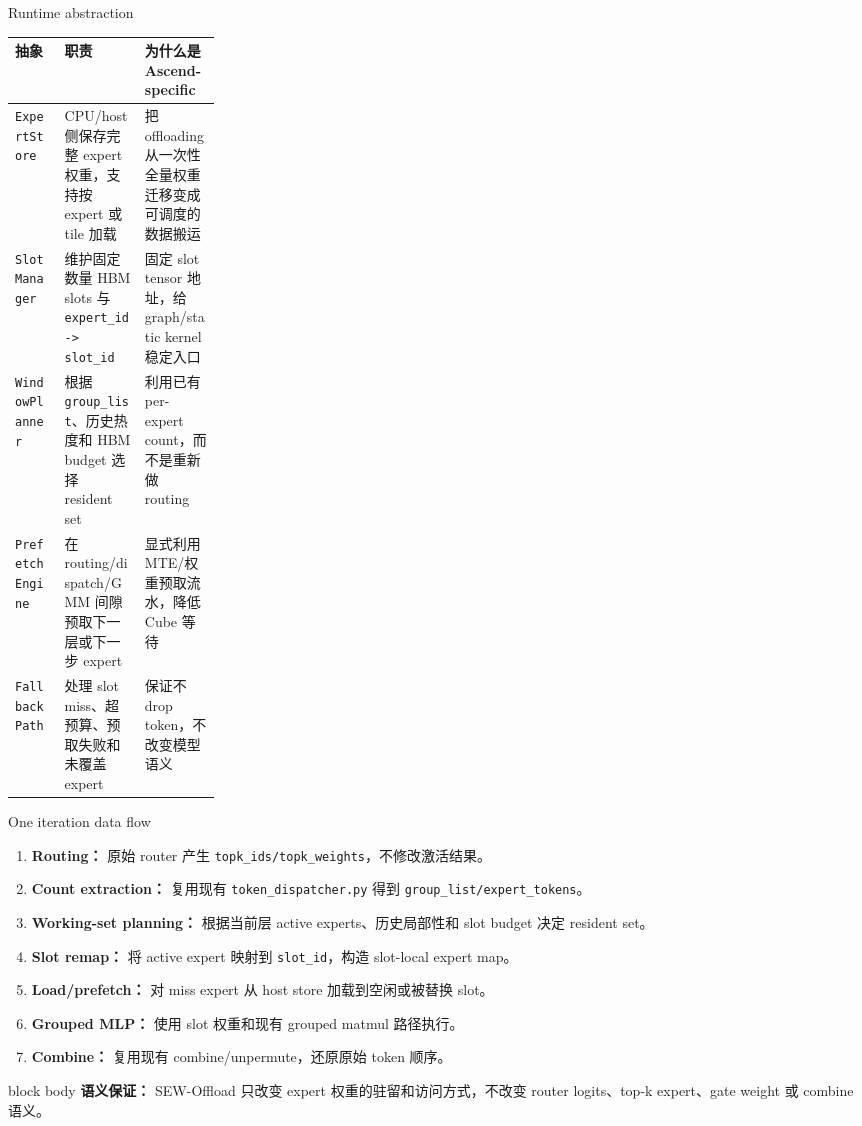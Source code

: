\documentclass[aspectratio=169,10pt]{beamer}
\begin{document}
\begin{frame}[t]{Runtime abstraction}
\small
\vspace{-0.4em}

\begin{tabularx}{\linewidth}{p{0.24\linewidth}X X}
\toprule
\textbf{抽象} & \textbf{职责} & \textbf{为什么是 Ascend-specific} \\
\midrule
\texttt{ExpertStore} &
CPU/host 侧保存完整 expert 权重，支持按 expert 或 tile 加载 &
把 offloading 从一次性全量权重迁移变成可调度的数据搬运 \\
\texttt{SlotManager} &
维护固定数量 HBM slots 与 \texttt{expert\_id -> slot\_id} &
固定 slot tensor 地址，给 graph/static kernel 稳定入口 \\
\texttt{WindowPlanner} &
根据 \texttt{group\_list}、历史热度和 HBM budget 选择 resident set &
利用已有 per-expert count，而不是重新做 routing \\
\texttt{PrefetchEngine} &
在 routing/dispatch/GMM 间隙预取下一层或下一步 expert &
显式利用 MTE/权重预取流水，降低 Cube 等待 \\
\texttt{FallbackPath} &
处理 slot miss、超预算、预取失败和未覆盖 expert &
保证不 drop token，不改变模型语义 \\
\bottomrule
\end{tabularx}
\end{frame}

\begin{frame}[t]{One iteration data flow}
\small
\vspace{-0.35em}

\begin{enumerate}
  \setlength\itemsep{0.65em}
  \item \textbf{Routing：} 原始 router 产生 \texttt{topk\_ids/topk\_weights}，不修改激活结果。
  \item \textbf{Count extraction：} 复用现有 \texttt{token\_dispatcher.py} 得到 \texttt{group\_list/expert\_tokens}。
  \item \textbf{Working-set planning：} 根据当前层 active experts、历史局部性和 slot budget 决定 resident set。
  \item \textbf{Slot remap：} 将 active expert 映射到 \texttt{slot\_id}，构造 slot-local expert map。
  \item \textbf{Load/prefetch：} 对 miss expert 从 host store 加载到空闲或被替换 slot。
  \item \textbf{Grouped MLP：} 使用 slot 权重和现有 grouped matmul 路径执行。
  \item \textbf{Combine：} 复用现有 combine/unpermute，还原原始 token 顺序。
\end{enumerate}

\vspace{0.55em}
\begin{beamercolorbox}[wd=\linewidth,sep=0.7em,rounded=true]{block body}
\textbf{\textcolor{AccentRed}{语义保证：}}
SEW-Offload 只改变 expert 权重的驻留和访问方式，不改变 router logits、top-k expert、gate weight 或 combine 语义。
\end{beamercolorbox}
\end{frame}
\end{document}
